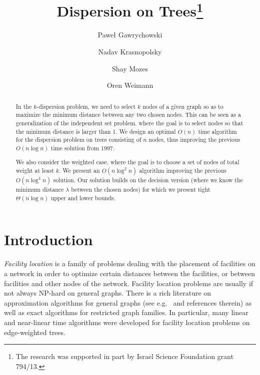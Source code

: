 \documentclass[11pt,a4paper]{article}
\newcommand{\Oh}{{O}}
\theoremstyle{definition}
\theoremstyle{remark}
\begin{document}
\title{Dispersion on Trees\thanks{The research was supported in part by Israel Science Foundation grant 794/13.}}
\author[1]{Pawe\l{} Gawrychowski}
\author[1]{Nadav Krasnopolsky}
\author[2]{Shay Mozes}
\author[1]{Oren Weimann}


\date{}
\maketitle

\begin{abstract}
In the $k$-dispersion problem, we need to select $k$ nodes of a given graph so as to maximize
the minimum distance between any two chosen nodes. This can be seen as a generalization
of the independent set problem, where the goal is to select nodes so that the minimum distance
is larger than 1.
We design an optimal $\Oh(n)$ time algorithm for the dispersion problem on trees consisting
of $n$ nodes, thus improving the previous  $\Oh(n\log n)$ time solution from 1997. 

We also consider the weighted case, where the goal is to choose a set of nodes of total weight at least $k$. We present an $\Oh(n\log^2n)$ algorithm improving the previous $\Oh(n\log^4 n)$ solution. Our solution builds on the decision version (where we know the minimum distance $\lambda$ between the chosen nodes) for which we present tight $\Theta(n\log n)$ upper and lower bounds. 
\end{abstract}

\section{Introduction}

\emph{Facility location} is a family of problems dealing with the placement of facilities on a network in order to optimize certain distances between the facilities, or between facilities and other nodes of the network. Facility location problems are usually if not always NP-hard on general graphs. There is a rich literature on approximation algorithms for general graphs (see e.g.~\cite{DavidB.Shmoys1997,Vazirani2003} and references therein) as well as exact algorithms for restricted graph families. In particular, many linear and near-linear time algorithms were developed for facility location problems on edge-weighted trees.   
\end{document}
